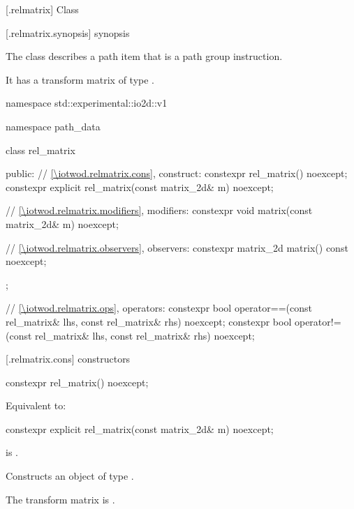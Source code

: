  [\iotwod.relmatrix] {Class }%

 [\iotwod.relmatrix.synopsis] { synopsis}%

\pnum
{}%
The class  describes a path item that is a path group instruction.

\pnum
It has a transform matrix of type .

\begin{codeblock}
namespace std::experimental::io2d::v1 {
  namespace path_data {
    class rel_matrix {
    public:
      // \ref{\iotwod.relmatrix.cons}, construct:
      constexpr rel_matrix() noexcept;
      constexpr explicit rel_matrix(const matrix_2d& m) noexcept;

      // \ref{\iotwod.relmatrix.modifiers}, modifiers:
      constexpr void matrix(const matrix_2d& m) noexcept;

      // \ref{\iotwod.relmatrix.observers}, observers:
      constexpr matrix_2d matrix() const noexcept;
    };
    
    // \ref{\iotwod.relmatrix.ops}, operators:
    constexpr bool operator==(const rel_matrix& lhs, const rel_matrix& rhs) 
      noexcept;
    constexpr bool operator!=(const rel_matrix& lhs, const rel_matrix& rhs) 
      noexcept;
  }
}
\end{codeblock}

 [\iotwod.relmatrix.cons] { constructors}

%
\begin{itemdecl}
constexpr rel_matrix() noexcept;
\end{itemdecl}
\begin{itemdescr}
\pnum
\effects
Equivalent to: 
\end{itemdescr}

%
\begin{itemdecl}
constexpr explicit rel_matrix(const matrix_2d& m) noexcept;
\end{itemdecl}
\begin{itemdescr}
\pnum
\requires
{} is .

\pnum
\effects
Constructs an object of type .

\pnum
The transform matrix is .
\end{itemdescr}

